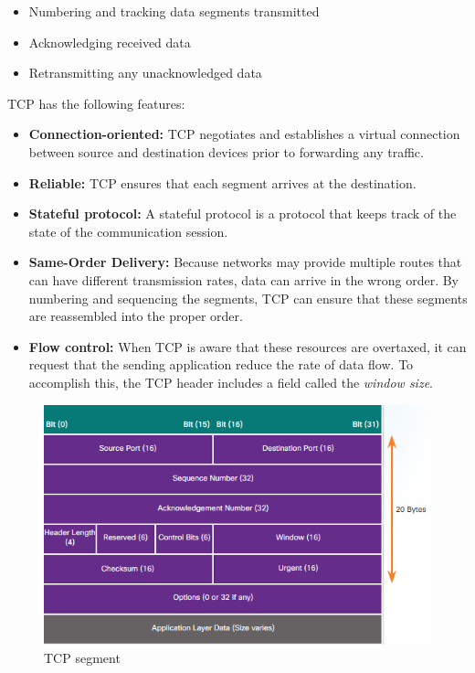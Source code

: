 \begin{itemize}
\item Numbering and tracking data segments transmitted 
\item Acknowledging received data
\item Retransmitting any unacknowledged data 
\end{itemize}

TCP has the following features:

\begin{itemize}
\item  \textbf{Connection-oriented:} TCP negotiates and establishes a virtual connection between source and destination devices prior to forwarding any traffic.

\item \textbf{Reliable:} TCP ensures that each segment arrives at the destination. 

\item \textbf{Stateful protocol:} A stateful protocol is a protocol that keeps track of the state of the communication session. 

\item \textbf{Same-Order Delivery:} Because networks may provide multiple routes that can have different transmission rates, data can arrive in the wrong order. By numbering and sequencing the segments, TCP can ensure that these segments are reassembled into the proper order.

\item \textbf{Flow control:} When TCP is aware that these resources are overtaxed, it can request that the sending application reduce the rate of data flow. To accomplish this, the TCP header includes a field called the \emph{window size}.
\end{itemize}

\begin{figure}[hbtp]
\caption{TCP segment}\label{TCPheader}
\centering
\includegraphics[scale=0.5]{pictures/TCPheader.PNG}
\end{figure}


